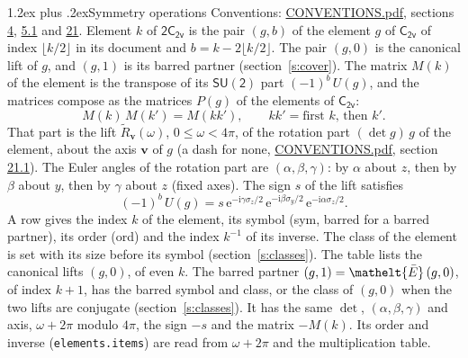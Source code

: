 \documentclass[10pt,a4paper]{article}
\makeatletter
\renewcommand\section{\@startsection{section}{1}{\z@}{-3ex plus -1ex minus -.2ex}%
  {1.2ex plus .2ex}{\normalfont\large\sffamily\bfseries\color{parttitle}}}
\numberwithin{equation}{section}
\newcommand{\eltfont}[1]{{\let\sigma\eltsigma\mathelt{#1}}}
\newcommand{\grp}[1]{\mathsf{#1}}
\newcommand{\elt}[1]{\eltfont{#1}}
\newcommand{\vv}{\mathbf{v}}
\newcommand{\iunit}{\mathrm{i}}
\newcommand{\expe}{\mathrm{e}}
\newcommand{\barred}[1]{\bar{#1}}
\newcommand{\lift}[1]{\tilde{#1}}
\newcommand{\pauli}[1]{\sigma_{#1}}
\makeatother
\begin{document}
\section{Symmetry operations}\label{s:elements}
Conventions: \href{../../CONVENTIONS.pdf}{CONVENTIONS.pdf}, sections \href{../../../rotation/CONVENTIONS.pdf\#conv.4}{4}, \href{../../../rotation/CONVENTIONS.pdf\#conv.5.1}{5.1} and \href{../../CONVENTIONS.pdf\#conv.21}{21}.
\leavevmode\label{n:index.element}\label{n:element.g}Element $k$ of $\grp{2C_{2v}}$ is the pair $(g, b)$ of the element $g$ of \href{../../../rotation/data/pdf/C2v.pdf}{$\grp{C_{2v}}$} of index $\lfloor k/2\rfloor$ in its document and $b = k - 2\lfloor k/2\rfloor$. The pair $(g, 0)$ is the canonical lift of $g$, and $(g, 1)$ is its barred partner (section~\ref{s:cover}). \label{n:matrix.element.pin}\label{n:matrix.element}The matrix $M(k)$ of the element is the transpose of its $\grp{SU(2)}$ part $(-1)^{b}\,U(g)$, and the matrices compose as the matrices $P(g)$ of the elements of $\grp{C_{2v}}$:
\begin{equation}\label{e:mprod}M(k)\,M(k') = M(kk'),\qquad kk' = \text{first } k\text{, then } k'.\end{equation}
\leavevmode\label{n:angle.omega}\label{n:vector.axis}\label{n:vector.pole}That part is the lift $\lift{R}_{\vv}(\omega)$, $0 \le \omega < 4\pi$, of the rotation part $(\det g)\,g$ of the element, about the axis $\vv$ of $g$ (a dash for none, \href{../../CONVENTIONS.pdf}{CONVENTIONS.pdf}, section \href{../../CONVENTIONS.pdf\#conv.21.1}{21.1}). \label{n:angle.euler.alpha}\label{n:angle.euler.beta}\label{n:angle.euler.gamma}\label{n:vector.coordinates}The Euler angles of the rotation part are $(\alpha,\beta,\gamma)$: by $\alpha$ about $z$, then by $\beta$ about $y$, then by $\gamma$ about $z$ (fixed axes). \label{n:local.euler.sign}The sign $s$ of the lift satisfies
\begin{equation}\label{e:euler}(-1)^{b}\,U(g) = s\,\expe^{-\iunit\gamma\pauli{z}/2}\,\expe^{-\iunit\beta\pauli{y}/2}\,\expe^{-\iunit\alpha\pauli{z}/2}.\end{equation}
\leavevmode\label{n:index.element.inverse}\label{n:head.sym}\label{n:head.ord}A row gives the index $k$ of the element, its symbol (sym, barred for a barred partner), its order (ord) and the index $k^{-1}$ of its inverse. \label{n:head.class}The class of the element is set with its size before its symbol (section~\ref{s:classes}).
The table lists the canonical lifts $(g, 0)$, of even $k$. The barred partner $(g, 1) = \elt{\barred{E}}\,(g, 0)$, of index $k + 1$, has the barred symbol and class, or the class of $(g, 0)$ when the two lifts are conjugate (section~\ref{s:classes}). It has the same $\det$, $(\alpha,\beta,\gamma)$ and axis, $\omega + 2\pi$ modulo $4\pi$, the sign $-s$ and the matrix $-M(k)$. Its order and inverse (\texttt{elements.items}) are read from $\omega + 2\pi$ and the multiplication table.
\end{document}
